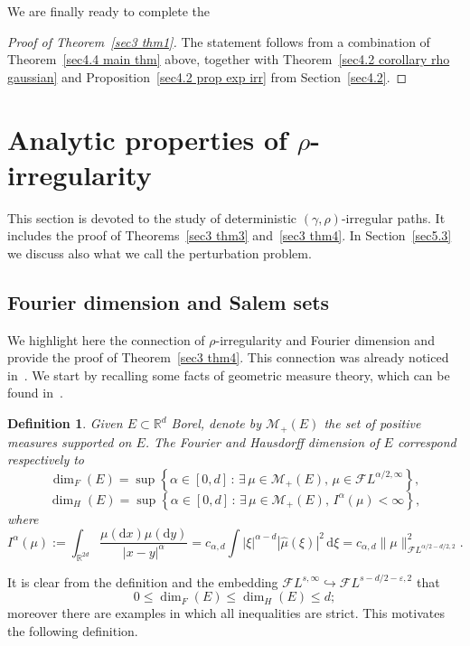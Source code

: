 \documentclass[10pt]{article}
\newcommand{\assign}{:=}
\newcommand{\mathd}{\mathrm{d}}
\newtheorem{definition}[theorem]{Definition}
\begin{document}
We are finally ready to complete the

\begin{proof}[Proof of Theorem~\ref{sec3 thm1}]
  The statement follows from a combination of Theorem~\ref{sec4.4 main thm}
  above, together with Theorem~\ref{sec4.2 corollary rho gaussian} and
  Proposition~\ref{sec4.2 prop exp irr} from Section~\ref{sec4.2}.
\end{proof}

\section{Analytic properties of $\rho$-irregularity}\label{sec5}

This section is devoted to the study of deterministic $(\gamma,
\rho)$\mbox{-}irregular paths. It includes the proof of Theorems~\ref{sec3
thm3} and~\ref{sec3 thm4}. In Section~\ref{sec5.3} we discuss also what we
call the perturbation problem.

\subsection{Fourier dimension and Salem sets}\label{sec5.1}

We highlight here the connection of $\rho$\mbox{-}irregularity and Fourier
dimension and provide the proof of Theorem~\ref{sec3 thm4}. This connection
was already noticed in~{\cite{choukgubinelli2}}. We start by recalling some
facts of geometric measure theory, which can be found in~{\cite{mattila}}.

\begin{definition}
  Given $E \subset \mathbb{R}^d$ Borel, denote by $\mathcal{M}_+ (E)$ the set
  of positive measures supported on $E$. The Fourier and Hausdorff dimension
  of $E$ correspond respectively to
  \[ \dim_F (E) = \sup \left\{ \alpha \in [0, d] \, : \, \exists \, \mu \in
     \mathcal{M}_+ (E), \, \mu \in \mathcal{F} L^{\alpha / 2, \infty}
     \right\}, \]
  \[ \dim_H (E) = \sup \left\{ \alpha \in [0, d] \, : \, \exists \, \mu \in
     \mathcal{M}_+ (E), \, I^{\alpha} (\mu) < \infty \right\}, \]
  where
  \[ I^{\alpha} (\mu) \assign \int_{\mathbb{R}^{2 d}} \frac{\mu (\mathd x) \mu
     (\mathd y)}{| x - y |^{\alpha}} = c_{\alpha, d} \int | \xi |^{\alpha - d}
     | \hat{\mu} (\xi) |^2 \, \mathd \xi = c_{\alpha, d} \| \mu
     \|^2_{\mathcal{F} L^{\alpha / 2 - d / 2, 2}} . \]
\end{definition}

It is clear from the definition and the embedding $\mathcal{F} L^{s, \infty}
\hookrightarrow \mathcal{F} L^{s - d / 2 - \varepsilon, 2}$ that
\begin{equation}
  0 \leqslant \dim_F (E) \leqslant \dim_H (E) \leqslant d ; \label{sec 5.1
  relation dimensions}
\end{equation}
moreover there are examples in which all inequalities are strict. This
motivates the following definition.
\end{document}
